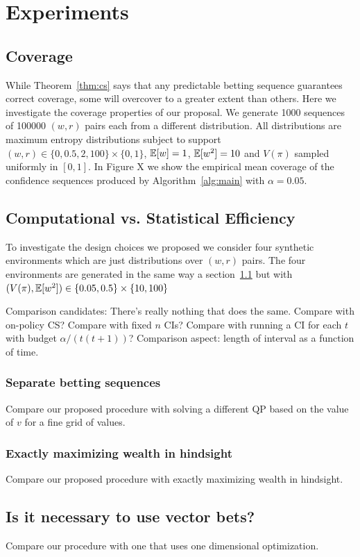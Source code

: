 \section{Experiments}



\subsection{Coverage} \label{sec:coverage}
While Theorem~\ref{thm:cs} says that any predictable betting sequence
guarantees correct coverage, some will overcover to a greater extent than others. Here we investigate the coverage properties of our 
proposal. We generate 1000 sequences of 100000 $(w,r)$ pairs 
each from a different distribution. All distributions are 
maximum entropy distributions subject to
support $(w,r) \in \{0, 0.5, 2, 100\} \times \{0,1\}$,
$\mathbb{E}[w]=1$, $\mathbb{E}[w^2]=10$ and $V(\pi)$ sampled uniformly 
in $[0,1]$. In Figure X we show the 
empirical mean coverage of the confidence sequences produced 
by Algorithm~\ref{alg:main} with $\alpha=0.05$. 


\subsection{Computational vs. Statistical Efficiency}
To investigate the design choices we proposed we consider
four synthetic environments which are just 
distributions over $(w,r)$ pairs. The four environments
are generated in the same way a section~\ref{sec:coverage}
but with $(V(\pi),\mathbb{E}[w^2]) \in \{0.05, 0.5\} \times \{10, 100\}$

Comparison candidates: There's really nothing that does 
the same. Compare with on-policy CS? 
Compare with fixed $n$ CIs?
Compare with running a CI for each $t$ with budget 
$\alpha/(t(t+1))$?
Comparison aspect: length of interval as a function of time.
\subsubsection{Separate betting sequences}
Compare our proposed procedure with solving a different QP based on 
the value of $v$ for a fine grid of values.
\subsubsection{Exactly maximizing wealth in hindsight}
Compare our proposed procedure with exactly maximizing wealth in hindsight.
\subsection{Is it necessary to use vector bets?}
Compare our procedure with one that uses one dimensional optimization.

